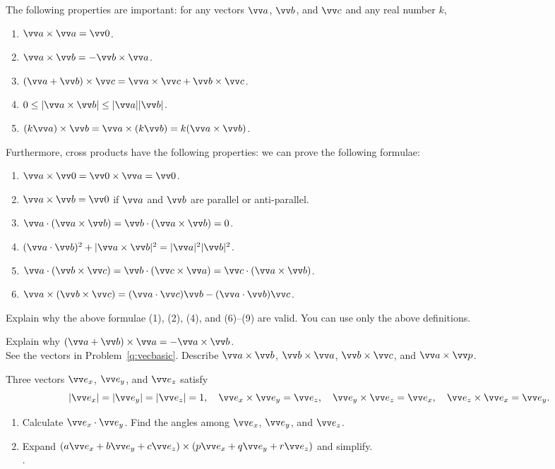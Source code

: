 \documentclass[11pt,pdfa,lastpage]{MishoNote}
\begin{document}
The following properties are important: for any vectors $\vc a$, $\vc b$, and $\vc c$ and any real number $k$,
\begin{enumerate}[label=\textsf{(\arabic*)}]
    \item $\vc a\times\vc a=\vc 0$.
    \item $\vc a\times\vc b=-\vc b\times\vc a$.
    \item $(\vc a+\vc b)\times\vc c=\vc a\times\vc c+\vc b\times \vc c$.
    \item $0\le|\vc a\times\vc b|\le|\vc a||\vc b|$.
    \item $(k\vc a)\times\vc b=\vc a\times(k\vc b)=k(\vc a\times\vc b)$.
\end{enumerate}
Furthermore, cross products have the following properties:
we can prove the following formulae:
\begin{enumerate}[label=\textsf{(\arabic*)},resume]
    \item $\vc a\times\vc 0=\vc 0\times\vc a=\vc 0$.
    \item $\vc a\times\vc b=\vc 0$ if $\vc a$ and $\vc b$ are parallel or anti-parallel.
    \item $\vc a\cdot(\vc a\times\vc b)=\vc b\cdot(\vc a\times\vc b)=0$.
    \item $(\vc a\cdot\vc b)^2+|\vc a\times\vc b|^2=|\vc a|^2|\vc b|^2$.
    \item $\vc a\cdot(\vc b\times\vc c)=\vc b\cdot(\vc c\times\vc a)=\vc c\cdot(\vc a\times\vc b)$.
    \item $\vc a\times(\vc b\times\vc c)=(\vc a\cdot\vc c)\vc b-(\vc a\cdot\vc b)\vc c$.
\end{enumerate}
\begin{quizzes}
  \Quiz[B] Explain why the above formulae (1), (2), (4), and (6)--(9) are valid. You can use only the above definitions.~

  \Quiz[S]{}  Explain why $(\vc a+\vc b)\times \vc a=-\vc a\times\vc b$.
  \\\TAB{}
    See the vectors in Problem~\ref{q:vecbasic}. Describe $\vc a\times \vc b$, $\vc b\times \vc a$, $\vc b\times \vc c$, and $\vc a\times \vc p$.
\end{quizzes}

\begin{problems}
  \Problem[A] Three vectors $\vvex$, $\vvey$, and $\vvez$ satisfy
  \[ |\vvex|=|\vvey|=|\vvez|=1,
   \quad \vvex\times\vvey=\vvez,
   \quad \vvey\times\vvez=\vvex,
   \quad \vvez\times\vvex=\vvey.
  \]
  \begin{enumerate}
    \item Calculate $\vvex\cdot\vvey$. Find the angles among $\vvex$, $\vvey$, and $\vvez$.
    \item Expand $(a\vvex+b\vvey+c\vvez)\times(p\vvex+q\vvey+r\vvez)$ and simplify.\\
      \phantom.\hfill{}
  \end{enumerate}
\end{problems}
\end{document}
